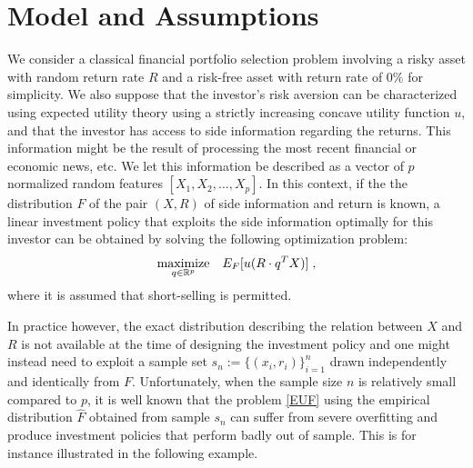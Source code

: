 \section{Model and Assumptions}\label{sec:model}
\newcommand{\Prob}{P}
\newcommand{\F}{F}
\newcommand{\Fhat}{{\hat{\F}}}
\newcommand{\qhat}{{\hat{q}}}
\newcommand{\Sx}{{\mathcal{S}_X}}
\newcommand{\Sr}{{\mathcal{S}_R}}
\newcommand{\Sn}{s_n}
\newcommand{\urange}{u_{\mbox{\footnotesize range}}}
\newcommand{\qhatOp}{{\bold{\qhat}}}







We consider a classical financial portfolio selection problem involving a risky asset with
random return rate $R$ and a risk-free asset with return rate of $0\%$ for simplicity. We
also suppose that the investor's risk aversion can be characterized using expected utility
theory using a strictly increasing concave utility function $u$, and that the investor has
access to side information regarding the returns. This information might be the result of
processing the most recent financial or economic news, etc. We let this information be
described as a vector of $p$ normalized random features $[X_1,X_2,\dots,X_p]$. In this
context, if the the distribution $\F$ of the pair $(X,R)$ of side information and return
is known, a linear investment policy that exploits the side information optimally for this
investor can be obtained by solving the following optimization problem:
\begin{equation}
\maximize_{q\in\Re^p}\;\;\;\E_\F[u(R\cdot q^TX)]\;,\label{EUF}
\end{equation}
where it is assumed that short-selling is permitted. 

In practice however, the exact distribution describing the relation between $X$ and $R$ is
not available at the time of designing the investment policy and one might instead need to
exploit a sample set $\Sn:=\{(x_i,r_i)\}_{i=1}^n$ drawn independently and identically from
$\F$. Unfortunately, when the sample size $n$ is relatively small compared to $p$, it is
well known that the problem \eqref{EUF} using the empirical distribution $\Fhat$ obtained
from sample $s_n$ can suffer from severe overfitting and produce investment policies that
perform badly out of sample. This is for instance illustrated in the following example.

